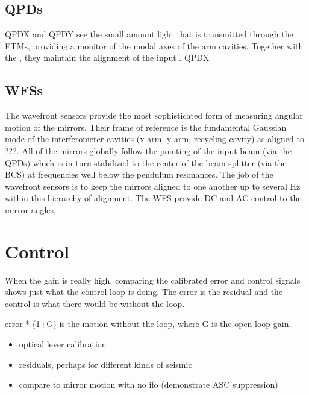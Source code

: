 \subsection{QPDs}  
QPDX and QPDY see the small amount light that is transmitted through
the ETMs, providing a monitor of the modal axes of the arm cavities. Together with the , they maintain the alignment of the input . QPDX 


\subsection{WFSs}  
The wavefront sensors provide the most sophisticated form of
measuring angular motion of the mirrors. Their frame of reference is
the fundamental Gaussian mode of the interferometer cavities (x-arm,
y-arm, recycling cavity) as aligned to ???. All of the mirrors
globally follow the pointing of the input beam (via the QPDs) which is
in turn stabilized to the center of the beam splitter (via the BCS) at frequencies well
below the pendulum resonances. The job of the wavefront sensors is to
keep the mirrors aligned to one another up to several Hz within this
hierarchy of alignment. The WFS provide DC and AC control to the
mirror angles. 




\section{Control}
When the gain is really high, comparing the calibrated error and
control signals shows just what the control loop is doing. The error
is the residual and the control is what there would be without the
loop.

error * (1+G) is the motion without the loop, where G is the open loop gain.

\begin{itemize} 
\item optical lever calibration
\item residuals, perhaps for different kinds of seismic
\item compare to mirror motion with no ifo (demonstrate ASC suppression)
\end{itemize}


